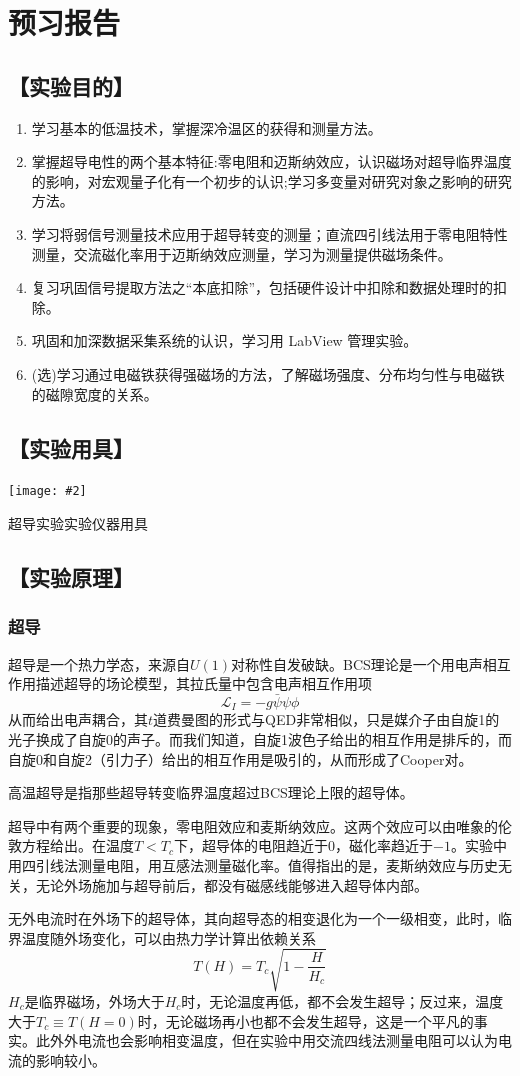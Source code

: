 \documentclass[11pt,a4paper]{ctexart}
\newcommand{\cpic}[2]{
\begin{center}
\texttt{[image: \#2]}
\end{center}
}
\newcommand{\beq}{\begin{equation}}
\newcommand{\eeq}{\end{equation}}
\newcommand{\lag}{\mathcal{L}}
\begin{document}
\newpage
\tableofcontents
\newpage
\section{预习报告}
\subsection{【实验目的】}
\begin{enumerate}
\item 学习基本的低温技术，掌握深冷温区的获得和测量方法。
\item
掌握超导电性的两个基本特征:零电阻和迈斯纳效应，认识磁场对超导临界温度的影响，对宏观量子化有一个初步的认识;学习多变量对研究对象之影响的研究方法。
\item
学习将弱信号测量技术应用于超导转变的测量；直流四引线法用于零电阻特性测量，交流磁化率用于迈斯纳效应测量，学习为测量提供磁场条件。
\item
复习巩固信号提取方法之“本底扣除”，包括硬件设计中扣除和数据处理时的扣除。
\item
巩固和加深数据采集系统的认识，学习用 LabView 管理实验。
\item
(选)学习通过电磁铁获得强磁场的方法，了解磁场强度、分布均匀性与电磁铁的磁隙宽度的关系。
\end{enumerate}
\subsection{【实验用具】}
\begin{table}[H]
\cpic{0.48}{equip}
\caption{超导实验实验仪器用具}
\end{table}
\subsection{【实验原理】}
\subsubsection{超导}
超导是一个热力学态，来源自$U(1)$对称性自发破缺\cite{qftga,cmft}。BCS理论是一个用电声相互作用描述超导的场论模型，其拉氏量中包含电声相互作用项
\beq
\lag_I = -g \bar{\psi} \psi \phi
\eeq
从而给出电声耦合，其$t$道费曼图的形式与QED非常相似，只是媒介子由自旋1的光子换成了自旋0的声子。而我们知道，自旋1波色子给出的相互作用是排斥的，而自旋0和自旋2（引力子）给出的相互作用是吸引的\cite{azqft}，从而形成了Cooper对。
\par
高温超导是指那些超导转变临界温度超过BCS理论上限的超导体。
\par
超导中有两个重要的现象，零电阻效应和麦斯纳效应。这两个效应可以由唯象的伦敦方程给出\cite{ed}。在温度$T<T_c$下，超导体的电阻趋近于0，磁化率趋近于$-1$。实验中用四引线法测量电阻，用互感法测量磁化率。值得指出的是，麦斯纳效应与历史无关，无论外场施加与超导前后，都没有磁感线能够进入超导体内部。
\par
无外电流时在外场下的超导体，其向超导态的相变退化为一个一级相变，此时，临界温度随外场变化，可以由热力学计算出\cite{ed,ssp}依赖关系
\beq
T(H) = T_c \sqrt{ 1 - \frac{H}{H_c}}
\eeq
$H_c$是临界磁场，外场大于$H_c$时，无论温度再低，都不会发生超导；反过来，温度大于$T_c \equiv T(H=0)$时，无论磁场再小也都不会发生超导，这是一个平凡的事实。此外外电流也会影响相变温度，但在实验中用交流四线法测量电阻可以认为电流的影响较小。
\end{document}
